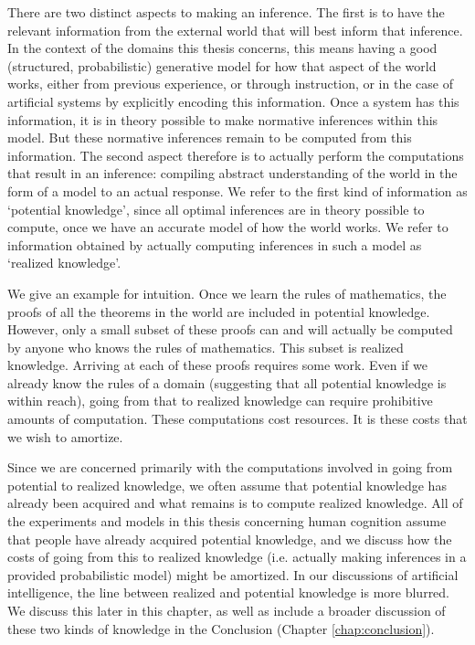 There are two distinct aspects to making an inference. The first is to have the relevant information from the external world that will best inform that inference. In the context of the domains this thesis concerns, this means having a good (structured, probabilistic) generative model for how that aspect of the world works, either from previous experience, or through instruction, or in the case of artificial systems by explicitly encoding this information. Once a system has this information, it is in theory possible to make normative inferences within this model. But these normative inferences remain to be computed from this information. The second aspect therefore is to actually perform the computations that result in an inference: compiling abstract understanding of the world in the form of a model to an actual response. We refer to the first kind of information as `potential knowledge', since all optimal inferences are in theory possible to compute, once we have an accurate model of how the world works. We refer to information obtained by actually computing inferences in such a model as `realized knowledge'. 

We give an example for intuition. Once we learn the rules of mathematics, the proofs of all the theorems in the world are included in potential knowledge. However, only a small subset of these proofs can and will actually be computed by anyone who knows the rules of mathematics. This subset is realized knowledge. Arriving at each of these proofs requires some work. Even if we already know the rules of a domain (suggesting that all potential knowledge is within reach), going from that to realized knowledge can require prohibitive amounts of computation. These computations cost resources. It is these costs that we wish to amortize. 

Since we are concerned primarily with the computations involved in going from potential to realized knowledge, we often assume that potential knowledge has already been acquired and what remains is to compute realized knowledge. All of the experiments and models in this thesis concerning human cognition assume that people have already acquired potential knowledge, and we discuss how the costs of going from this to realized knowledge (i.e. actually making inferences in a provided probabilistic model) might be amortized. In our discussions of artificial intelligence, the line between realized and potential knowledge is more blurred. We discuss this later in this chapter, as well as include a broader discussion of these two kinds of knowledge in the Conclusion (Chapter \ref{chap:conclusion}).

